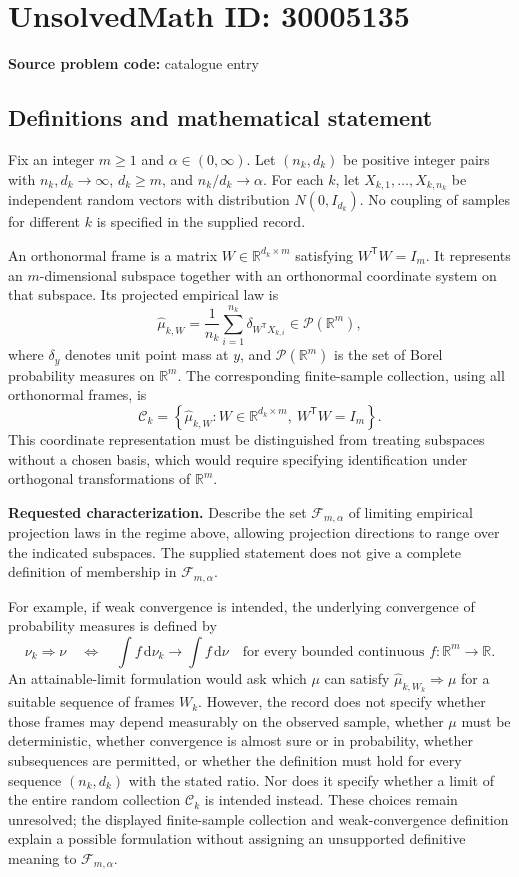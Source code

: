 \documentclass[11pt]{article}
\newcommand{\R}{\mathbb{R}}
\begin{document}
\section*{UnsolvedMath ID: 30005135}
\textbf{Source problem code:} catalogue entry
\subsection{Definitions and mathematical statement}
Fix an integer \(m\geq 1\) and \(\alpha\in(0,\infty)\). Let \((n_k,d_k)\) be positive integer pairs with \(n_k,d_k\to\infty\), \(d_k\geq m\), and \(n_k/d_k\to\alpha\). For each \(k\), let \(X_{k,1},\ldots,X_{k,n_k}\) be independent random vectors with distribution \(N(0,I_{d_k})\). No coupling of samples for different \(k\) is specified in the supplied record.

An orthonormal frame is a matrix \(W\in\R^{d_k\times m}\) satisfying \(W^{\mathsf T}W=I_m\). It represents an \(m\)-dimensional subspace together with an orthonormal coordinate system on that subspace. Its projected empirical law is
\[
\widehat\mu_{k,W}=\frac{1}{n_k}\sum_{i=1}^{n_k}\delta_{W^{\mathsf T}X_{k,i}}\in\mathcal P(\R^m),
\]
where \(\delta_y\) denotes unit point mass at \(y\), and \(\mathcal P(\R^m)\) is the set of Borel probability measures on \(\R^m\). The corresponding finite-sample collection, using all orthonormal frames, is
\[
\mathcal C_k=\left\{\widehat\mu_{k,W}:W\in\R^{d_k\times m},\ W^{\mathsf T}W=I_m\right\}.
\]
This coordinate representation must be distinguished from treating subspaces without a chosen basis, which would require specifying identification under orthogonal transformations of \(\R^m\).

\textbf{Requested characterization.} Describe the set \(\mathcal F_{m,\alpha}\) of limiting empirical projection laws in the regime above, allowing projection directions to range over the indicated subspaces. The supplied statement does not give a complete definition of membership in \(\mathcal F_{m,\alpha}\).

For example, if weak convergence is intended, the underlying convergence of probability measures is defined by
\[
\nu_k\Rightarrow\nu
\quad\Longleftrightarrow\quad
\int f\,\mathrm d\nu_k\longrightarrow\int f\,\mathrm d\nu
\quad\text{for every bounded continuous }f:\R^m\to\R.
\]
An attainable-limit formulation would ask which \(\mu\) can satisfy \(\widehat\mu_{k,W_k}\Rightarrow\mu\) for a suitable sequence of frames \(W_k\). However, the record does not specify whether those frames may depend measurably on the observed sample, whether \(\mu\) must be deterministic, whether convergence is almost sure or in probability, whether subsequences are permitted, or whether the definition must hold for every sequence \((n_k,d_k)\) with the stated ratio. Nor does it specify whether a limit of the entire random collection \(\mathcal C_k\) is intended instead. These choices remain unresolved; the displayed finite-sample collection and weak-convergence definition explain a possible formulation without assigning an unsupported definitive meaning to \(\mathcal F_{m,\alpha}\).
\end{document}
